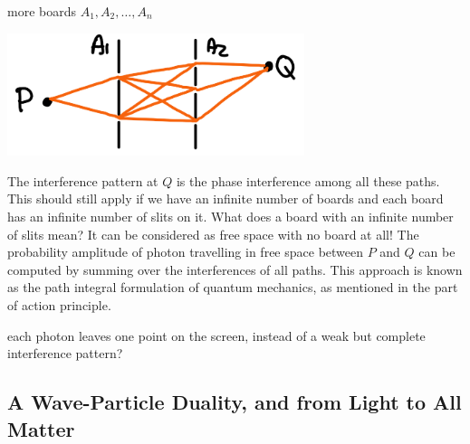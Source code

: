 {{{{                \item more boards $A_1, A_2, \ldots, A_n$
                \newline
                \begin{center}\includegraphics[width=0.65\textwidth]{dspi2}\end{center}
            }
            The interference pattern at $Q$ is the phase interference among all these paths. This should still apply if we have an infinite number of boards and each board has an infinite number of slits on it.
            \tcblower
            What does a board with an infinite number of slits mean? It can be considered as free space with no board at all! The probability amplitude of photon travelling in free space between $P$ and $Q$ can be computed by summing over the interferences of all paths. This approach is known as the path integral formulation of quantum mechanics, as mentioned in the part of action principle.
        }
        each photon leaves one point on the screen, instead of a weak but complete interference pattern?
    }
}

\subsection{A Wave-Particle Duality, and from Light to All Matter}



